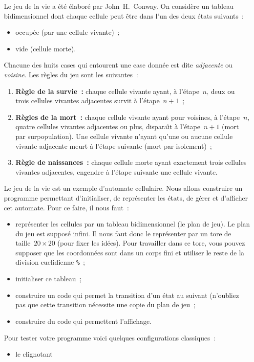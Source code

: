 \begin{exercice}
  Le  jeu  de la vie  a  \'et\'e \'elabor\'e par  John~H.\  Conway. On
  consid\`ere un tableau bidimensionnel    dont chaque  cellule   peut
  \^etre dans l'un des deux \'etats suivants~:
  \begin{itemize}
  \item occup\'ee (par une cellule vivante)~;
  \item vide (cellule morte).
  \end{itemize}
  Chacune des huits cases  qui  entourent une  case donn\'ee  est dite
  \textit{adjacente} ou \textit{voisine}.
  Les r\`egles du jeu sont les suivantes~:
  \begin{enumerate}
  \item \textbf{R\`egle de  la survie~:} chaque cellule vivante ayant,
    \`a l'\'etape~$n$, deux  ou  trois  cellules  vivantes  adjacentes
    survit \`a l'\'etape~${n+1}$~;
  \item \textbf{R\`egles  de  la mort~:} chaque  cellule vivante ayant
    pour voisines,   \`a   l'\'etape~$n$,  quatre  cellules   vivantes
    adjacentes ou plus, dispara\^\i{}t \`a l'\'etape~${n+1}$ (mort par
    surpopulation).   Une  cellule vivante   n'ayant qu'une  ou aucune
    cellule vivante adjacente meurt  \`a l'\'etape suivante  (mort par
    isolement)~;
  \item \textbf{R\`egle  de naissances~:}  chaque cellule  morte ayant
    exactement trois  cellules   vivantes   adjacentes, engendre   \`a
    l'\'etape suivante une cellule vivante.
  \end{enumerate}
  Le jeu de la vie est un  exemple d'automate cellulaire.  Nous allons
  construire un programme  permettant  d'initialiser, de repr\'esenter
  les \'etats, de g\'erer et d'afficher cet automate.
  Pour ce faire, il nous faut~:
  \begin{itemize}
  \item repr\'esenter les  cellules par un tableau bidimensionnel  (le
    plan de jeu). Le  plan du jeu  est suppos\'e infini.  Il nous faut
    donc le repr\'esenter par  un tore de taille~${20\times 20}$ (pour
    fixer  les id\'ees).  Pour  travailler dans  ce tore, vous  pouvez
    supposer que les coordonn\'ees sont dans un corps fini et utiliser
    le reste de la division euclidienne \texttt{\%}~;
  \item initialiser ce tableau~;
  \item construire  un code qui  permet  la transition d'un \'etat  au
    suivant (n'oubliez pas  que cette transition n\'ecessite une copie
    du plan de jeu~;
  \item construire du code qui permettent l'affichage.
  \end{itemize}
  Pour tester votre programme voici quelques configurations classiques~:
  \begin{itemize}
  \item le clignotant
\begin{verbatim}
     

\end{verbatim}
\end{itemize}
\end{exercice}
